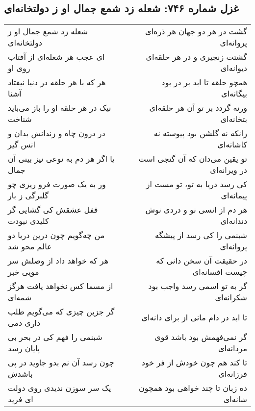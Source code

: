 \begin{center}
\section*{غزل شماره ۷۴۶: شعله زد شمع جمال او ز دولتخانه‌ای}
\label{sec:746}
\begin{longtable}{l p{0.5cm} r}
شعله زد شمع جمال او ز دولتخانه‌ای
&&
گشت در هر دو جهان هر ذره‌ای پروانه‌ای
\\
ای عجب هر شعله‌ای از آفتاب روی او
&&
گشتت زنجیری و در هر حلقه‌ای دیوانه‌ای
\\
هر که با هر حلقه در دنیا نیفتاد آشنا
&&
همچو حلقه تا ابد بر در بود بیگانه‌ای
\\
نیک در هر حلقه او را باز می‌باید شناخت
&&
ورنه گردد بر تو آن هر حلقه‌ای بتخانه‌ای
\\
در درون چاه و زندانش بدان و انس گیر
&&
زانکه نه گلشن بود پیوسته نه کاشانه‌ای
\\
یا اگر هر دم به نوعی نیز بینی آن جمال
&&
تو یقین می‌دان که آن گنجی است در ویرانه‌ای
\\
ور به یک صورت فرو ریزی چو گلبرگی ز بار
&&
کی رسد دریا به تو، تو مست از پیمانه‌ای
\\
قفل عشقش کی گشایی گر کلیدی نبودت
&&
هر دم از انسی نو و دردی نوش دندانه‌ای
\\
من چه‌گویم چون درین دریا دو عالم محو شد
&&
شبنمی را کی رسد از پیشگه پروانه‌ای
\\
هر که خواهد داد از وصلش سر مویی خبر
&&
در حقیقت آن سخن دانی که چیست افسانه‌ای
\\
از مسما کس نخواهد یافت هرگز شمه‌ای
&&
گر به تو اسمی رسد واجب بود شکرانه‌ای
\\
گر جزین چیزی که می‌گویم طلب داری دمی
&&
تا ابد در دام مانی از برای دانه‌ای
\\
شبنمی را فهم کی در بحر بی پایان رسد
&&
گر نمی‌فهمش بود باشد قوی مردانه‌ای
\\
چون رسد آن نم بدو جاوید در پی باشدش
&&
تا کند هم چون خودش از فر خود فرزانه‌ای
\\
یک سر سوزن ندیدی روی دولت ای فرید
&&
ده زبان تا چند خواهی بود همچون شانه‌ای
\\
\end{longtable}
\end{center}
